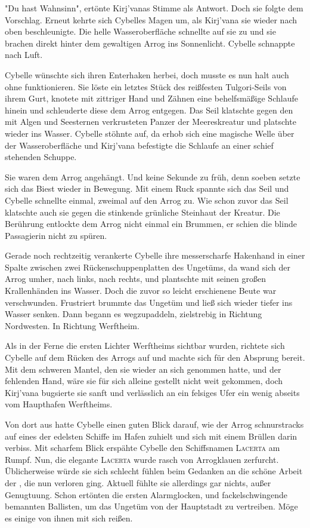"Du hast Wahnsinn", ertönte Kirj'vanas Stimme als Antwort. Doch sie folgte dem Vorschlag. Erneut kehrte sich Cybelles Magen um, als Kirj'vana sie wieder nach oben beschleunigte. Die helle Wasseroberfläche schnellte auf sie zu und sie brachen direkt hinter dem gewaltigen Arrog ins Sonnenlicht. Cybelle schnappte nach Luft.

Cybelle wünschte sich ihren Enterhaken herbei, doch musste es nun halt auch ohne funktionieren. Sie löste ein letztes Stück des reißfesten Tulgori-Seils von ihrem Gurt, knotete mit zittriger Hand und Zähnen eine behelfsmäßige Schlaufe hinein und schleuderte diese dem Arrog entgegen. Das Seil klatschte gegen den mit Algen und Seesternen verkrusteten Panzer der Meereskreatur und platschte wieder ins Wasser. Cybelle stöhnte auf, da erhob sich eine magische Welle über der Wasseroberfläche und Kirj'vana befestigte die Schlaufe an einer schief stehenden Schuppe.

Sie waren dem Arrog angehängt. Und keine Sekunde zu früh, denn soeben setzte sich das Biest wieder in Bewegung. Mit einem Ruck spannte sich das Seil und Cybelle schnellte einmal, zweimal auf den Arrog zu. Wie schon zuvor das Seil klatschte auch sie gegen die stinkende grünliche Steinhaut der Kreatur. Die Berührung entlockte dem Arrog nicht einmal ein Brummen, er schien die blinde Passagierin nicht zu spüren.

Gerade noch rechtzeitig verankerte Cybelle ihre messerscharfe Hakenhand in einer Spalte zwischen zwei Rückenschuppenplatten des Ungetüms, da wand sich der Arrog umher, nach links, nach rechts, und plantschte mit seinen großen Krallenhänden ins Wasser. Doch die zuvor so leicht erschienene Beute war verschwunden. Frustriert brummte das Ungetüm und ließ sich wieder tiefer ins Wasser senken. Dann begann es wegzupaddeln, zielstrebig in Richtung Nordwesten. In Richtung Werftheim.

\trennzeichen

Als in der Ferne die ersten Lichter Werftheims sichtbar wurden, richtete sich Cybelle auf dem Rücken des Arrogs auf und machte sich für den Absprung bereit. Mit dem schweren Mantel, den sie wieder an sich genommen hatte, und der fehlenden Hand, wäre sie für sich alleine gestellt nicht weit gekommen, doch Kirj'vana bugsierte sie sanft und verlässlich an ein felsiges Ufer ein wenig abseits vom Haupthafen Werftheims.

Von dort aus hatte Cybelle einen guten Blick darauf, wie der Arrog schnurstracks auf eines der edelsten Schiffe im Hafen zuhielt und sich mit einem Brüllen darin verbiss. Mit scharfem Blick erspähte Cybelle den Schiffsnamen \textsc{Lacerta} am Rumpf. Nun, die elegante \textsc{Lacerta} wurde rasch von Arrogklauen zerfurcht. Üblicherweise würde sie sich schlecht fühlen beim Gedanken an die schöne Arbeit der , die nun verloren ging. Aktuell fühlte sie allerdings gar nichts, außer Genugtuung. Schon ertönten die ersten Alarmglocken, und fackelschwingende  bemannten Ballisten, um das Ungetüm von der Hauptstadt zu vertreiben. Möge es einige von ihnen mit sich reißen.


